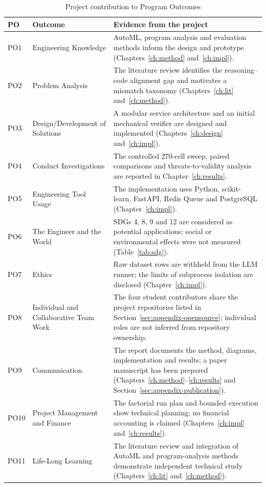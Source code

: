 \begin{table}[H]
\centering
\caption{Project contribution to Program Outcomes}
\label{tab:project-po}
\footnotesize
\setlength{\tabcolsep}{3pt}
\renewcommand{\arraystretch}{1.15}
\begin{tabular}{@{}>{\raggedright\arraybackslash}p{0.9cm}
  >{\raggedright\arraybackslash}p{3.4cm}
  >{\raggedright\arraybackslash}p{9.7cm}@{}}
\toprule
\textbf{PO} & \textbf{Outcome} & \textbf{Evidence from the project} \\
\midrule
PO1 & Engineering Knowledge & AutoML, program analysis and evaluation
methods inform the design and prototype (Chapters~\ref{ch:method}
and~\ref{ch:impl}). \\
PO2 & Problem Analysis & The literature review identifies the
reasoning--code alignment gap and motivates a mismatch taxonomy
(Chapters~\ref{ch:lit} and~\ref{ch:method}). \\
PO3 & Design/Development of Solutions & A modular service architecture
and an initial mechanical verifier are designed and implemented
(Chapters~\ref{ch:design} and~\ref{ch:impl}). \\
PO4 & Conduct Investigations & The controlled 270-cell sweep, paired
comparisons and threats-to-validity analysis are reported in
Chapter~\ref{ch:results}. \\
PO5 & Engineering Tool Usage & The implementation uses Python,
scikit-learn, FastAPI, Redis Queue and PostgreSQL
(Chapter~\ref{ch:impl}). \\
PO6 & The Engineer and the World & SDGs 4, 8, 9 and 12 are considered
as potential applications; social or environmental effects were
not measured (Table~\ref{tab:sdg}). \\
PO7 & Ethics & Raw dataset rows are withheld from the LLM runner;
the limits of subprocess isolation are disclosed
(Chapter~\ref{ch:impl}). \\
PO8 & Individual and Collaborative Team Work & The four student
contributors share the project repositories listed in
Section~\ref{sec:appendix-opensource};
individual roles are not inferred from repository ownership. \\
PO9 & Communication & The report documents the method, diagrams,
implementation and results; a paper manuscript has been prepared
(Chapters~\ref{ch:method}--\ref{ch:results} and
Section~\ref{sec:appendix-publication}). \\
PO10 & Project Management and Finance & The factorial run plan and
bounded execution show technical planning; no financial accounting
is claimed (Chapters~\ref{ch:impl} and~\ref{ch:results}). \\
PO11 & Life-Long Learning & The literature review and integration of
AutoML and program-analysis methods demonstrate independent technical
study (Chapters~\ref{ch:lit} and~\ref{ch:method}). \\
\bottomrule
\end{tabular}
\end{table}

